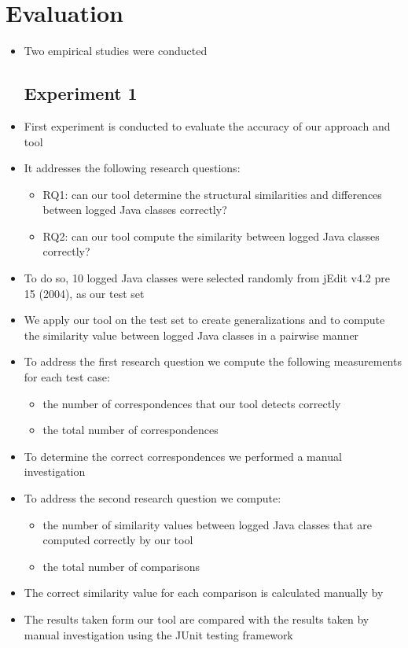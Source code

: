 \chapter{Evaluation}  \label{eval}
\begin{itemize} [leftmargin=.01in]
\item Two empirical studies were conducted
\section{Experiment 1}  \label{expr1}
\item First experiment is conducted to evaluate the accuracy of our approach and tool
\item It addresses the following research questions:
\begin{itemize} [leftmargin=.3in]
\item \textsc{RQ1: }can our tool determine the structural similarities and differences between logged Java classes correctly?
\item \textsc{RQ2: }can our tool compute the similarity between logged Java classes correctly?
\end{itemize}
\item To do so, 10 logged Java classes were selected randomly from jEdit v4.2 pre 15 (2004), as our test set
\item We apply our tool on the test set to create generalizations  and to compute the similarity value between logged Java classes in a pairwise manner
\item To address the first research question we compute the following measurements for each test case:
\begin{itemize} [leftmargin=.3in]
\item the number of correspondences that our tool detects correctly
\item the total number of correspondences
\end{itemize}
\item To determine the correct correspondences we performed a manual investigation
\item To address the second research question we compute:
\begin{itemize} [leftmargin=.3in]
\item the number of similarity values between logged Java classes that are computed correctly by our tool
\item the total number of comparisons
\end{itemize}
\item The correct similarity value for each comparison is calculated manually by
\item The results taken form our tool are compared with the results taken by manual investigation using the JUnit testing framework


\end{itemize}
